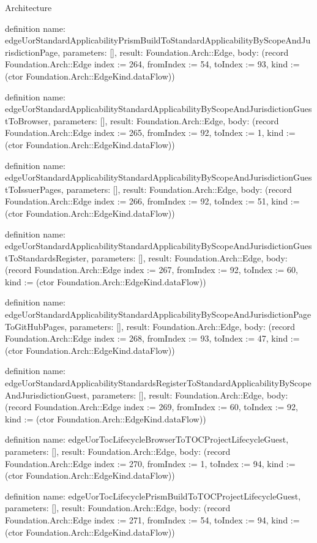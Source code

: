 \begin{lexlean}{Architecture}
\begin{semanticmodule}
definition{
  name: edgeUorStandardApplicabilityPrismBuildToStandardApplicabilityByScopeAndJurisdictionPage,
  parameters: [],
  result: Foundation.Arch::Edge,
  body: (record Foundation.Arch::Edge {index := 264, fromIndex := 54, toIndex := 93, kind := (ctor Foundation.Arch::EdgeKind.dataFlow)})
}

definition{
  name: edgeUorStandardApplicabilityStandardApplicabilityByScopeAndJurisdictionGuestToBrowser,
  parameters: [],
  result: Foundation.Arch::Edge,
  body: (record Foundation.Arch::Edge {index := 265, fromIndex := 92, toIndex := 1, kind := (ctor Foundation.Arch::EdgeKind.dataFlow)})
}

definition{
  name: edgeUorStandardApplicabilityStandardApplicabilityByScopeAndJurisdictionGuestToIssuerPages,
  parameters: [],
  result: Foundation.Arch::Edge,
  body: (record Foundation.Arch::Edge {index := 266, fromIndex := 92, toIndex := 51, kind := (ctor Foundation.Arch::EdgeKind.dataFlow)})
}

definition{
  name: edgeUorStandardApplicabilityStandardApplicabilityByScopeAndJurisdictionGuestToStandardsRegister,
  parameters: [],
  result: Foundation.Arch::Edge,
  body: (record Foundation.Arch::Edge {index := 267, fromIndex := 92, toIndex := 60, kind := (ctor Foundation.Arch::EdgeKind.dataFlow)})
}

definition{
  name: edgeUorStandardApplicabilityStandardApplicabilityByScopeAndJurisdictionPageToGitHubPages,
  parameters: [],
  result: Foundation.Arch::Edge,
  body: (record Foundation.Arch::Edge {index := 268, fromIndex := 93, toIndex := 47, kind := (ctor Foundation.Arch::EdgeKind.dataFlow)})
}

definition{
  name: edgeUorStandardApplicabilityStandardsRegisterToStandardApplicabilityByScopeAndJurisdictionGuest,
  parameters: [],
  result: Foundation.Arch::Edge,
  body: (record Foundation.Arch::Edge {index := 269, fromIndex := 60, toIndex := 92, kind := (ctor Foundation.Arch::EdgeKind.dataFlow)})
}

definition{
  name: edgeUorTocLifecycleBrowserToTOCProjectLifecycleGuest,
  parameters: [],
  result: Foundation.Arch::Edge,
  body: (record Foundation.Arch::Edge {index := 270, fromIndex := 1, toIndex := 94, kind := (ctor Foundation.Arch::EdgeKind.dataFlow)})
}

definition{
  name: edgeUorTocLifecyclePrismBuildToTOCProjectLifecycleGuest,
  parameters: [],
  result: Foundation.Arch::Edge,
  body: (record Foundation.Arch::Edge {index := 271, fromIndex := 54, toIndex := 94, kind := (ctor Foundation.Arch::EdgeKind.dataFlow)})
}


\end{semanticmodule}
\end{lexlean}
